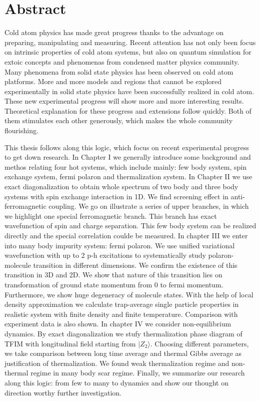 \intobmk\chapter*{Abstract}%

Cold atom physics has made great progress thanks to the advantage on preparing, manipulating and measuring. Recent attention has not only been focus on intrinsic properties of cold atom systems, but also on quantum simulation for extoic concepts and phenomenas from condensed matter physics community. Many phenomena from solid state physics has been observed on cold atom platforms. More and more models and regions that cannot be explored experimentally in solid state physics have been successfully realized in cold atom. These new experimental progress will show more and more interesting results. Theoretical explanation for these progress and extensions follow quickly. Both of them stimulates each other generously, which makes the whole community flourishing.

This thesis follows along this logic, which focus on recent experimental progress to get down research. In Chapter I we generally introduce some background and methos relating four hot systems, which include mainly: few body system, spin exchange system, fermi polaron and thermalization system. In Chapter II we use exact diagonalization to obtain whole spectrum of two body and three body systems with spin exchange interaction in 1D. We find screening effect in anti-ferromagnetic coupling. We go on illustrate a series of upper branches, in which we highlight one special ferromagnetic branch. This branch has exact wavefunction of spin and charge separation. This few body system can be realized directly and the special correlation coulde be measured. In chapter III we enter into many body impurity system: fermi polaron. We use unified variational wavefunction with up to 2 p-h excitations to systematically study polaron-molecule transition in different dimensions. We confirm the existence of this transition in 3D and 2D. We show that nature of this transition lies on transformation of ground state momentum from 0 to fermi momentum. Furthermore, we show huge degeneracy of molecule states. With the help of local density approximation we calculate trap-average single particle properties in realistic system with finite density and finite temperature. Comparison with experiment data is also shown. In chapter IV we consider non-equilibrium dynamics. By exact diagonalization we stufy thermalization phase diagram of TFIM with longitudinal field starting from $|Z_2\rangle$. Choosing different parameters, we take comparison between long time average and thermal Gibbs average as justification of thermalization. We found weak thermalization regime and non-thermal regime in many body scar regime. Finally, we summarize our research along this logic: from few to many to dynamics and show our thought on direction worthy further investigation.

